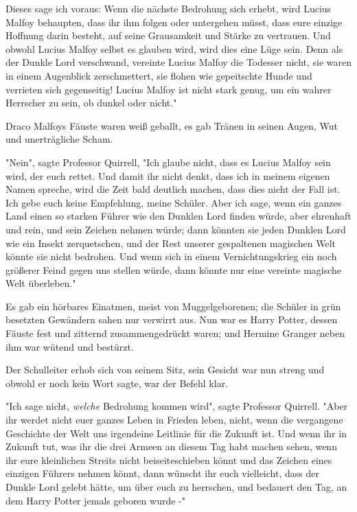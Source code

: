 {Dieses sage ich voraus: Wenn die nächste Bedrohung sich erhebt, wird Lucius Malfoy behaupten, dass ihr ihm folgen oder untergehen müsst, dass eure einzige Hoffnung darin besteht, auf seine Grausamkeit und Stärke zu vertrauen. Und obwohl Lucius Malfoy selbst es glauben wird, wird dies eine Lüge sein. Denn als der Dunkle Lord verschwand, vereinte Lucius Malfoy die Todesser nicht, sie waren in einem Augenblick zerschmettert, sie flohen wie gepeitschte Hunde und verrieten sich gegenseitig! Lucius Malfoy ist nicht stark genug, um ein wahrer Herrscher zu sein, ob dunkel oder nicht."

Draco Malfoys Fäuste waren weiß geballt, es gab Tränen in seinen Augen, Wut und unerträgliche Scham.

"Nein", sagte Professor Quirrell, "Ich glaube nicht, dass es Lucius Malfoy sein wird, der euch rettet. Und damit ihr nicht denkt, dass ich in meinem eigenen Namen spreche, wird die Zeit bald deutlich machen, dass dies nicht der Fall ist. Ich gebe euch keine Empfehlung, meine Schüler. Aber ich sage, wenn ein ganzes Land einen so starken Führer wie den Dunklen Lord finden würde, aber ehrenhaft und rein, und sein Zeichen nehmen würde; dann könnten sie jeden Dunklen Lord wie ein Insekt zerquetschen, und der Rest unserer gespaltenen magischen Welt könnte sie nicht bedrohen. Und wenn sich in einem Vernichtungskrieg ein noch größerer Feind gegen uns stellen würde, dann könnte nur eine vereinte magische Welt überleben."

Es gab ein hörbares Einatmen, meist von Muggelgeborenen; die Schüler in grün besetzten Gewändern sahen nur verwirrt aus. Nun war es Harry Potter, dessen Fäuste fest und zitternd zusammengedrückt waren; und Hermine Granger neben ihm war wütend und bestürzt.

Der Schulleiter erhob sich von seinem Sitz, sein Gesicht war nun streng und obwohl er noch kein Wort sagte, war der Befehl klar.

"Ich sage nicht, \emph{welche} Bedrohung kommen wird", sagte Professor Quirrell. "Aber ihr werdet nicht euer ganzes Leben in Frieden leben, nicht, wenn die vergangene Geschichte der Welt uns irgendeine Leitlinie für die Zukunft ist. Und wenn ihr in Zukunft tut, was ihr die drei Armeen an diesem Tag habt machen sehen, wenn ihr eure kleinlichen Streits nicht beiseiteschieben könnt und das Zeichen eines einzigen Führers nehmen könnt, dann wünscht ihr euch vielleicht, dass der Dunkle Lord gelebt hätte, um über euch zu herrschen, und bedauert den Tag, an dem Harry Potter jemals geboren wurde -"

}
